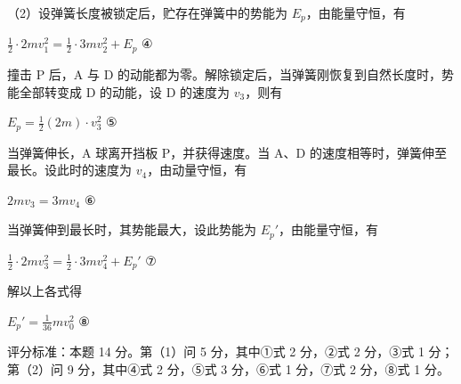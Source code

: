 \documentclass[\gkver]{gaokaozhenti}
\begin{document}
\begin{enumerate}
{（2）设弹簧长度被锁定后，贮存在弹簧中的势能为 $E_{p}$，由能量守恒，有

$\frac{1}{2}\cdot2mv_{1}^{2}=\frac{1}{2}\cdot3mv_{2}^{2}+E_{p}$ ④

撞击 P 后，A 与 D 的动能都为零。解除锁定后，当弹簧刚恢复到自然长度时，势能全部转变成 D 的动能，设 D 的速度为 $v_{3}$，则有

$E_{p}=\frac{1}{2}(2m)\cdot v_{3}^{2}$ ⑤

当弹簧伸长，A 球离开挡板 P，并获得速度。当 A、D 的速度相等时，弹簧伸至最长。设此时的速度为 $v_{4}$，由动量守恒，有

$2mv_{3}=3mv_{4}$ ⑥

当弹簧伸到最长时，其势能最大，设此势能为 $E_{p}'$，由能量守恒，有

$\frac{1}{2}\cdot2mv_{3}^{2}=\frac{1}{2}\cdot3mv_{4}^{2}+E_{p}'$ ⑦

解以上各式得

$E_{p}'=\frac{1}{36}mv_{0}^{2}$ ⑧

评分标准：本题 14 分。第（1）问 5 分，其中①式 2 分，②式 2 分，③式 1 分；第（2）问 9 分，其中④式 2 分，⑤式 3 分，⑥式 1 分，⑦式 2 分，⑧式 1 分。
}

\end{enumerate}
\end{document}
